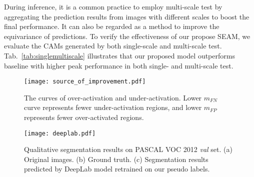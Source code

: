 \documentclass[10pt,twocolumn,letterpaper]{article}
\begin{document}
	During inference, it is a common practice to employ multi-scale test by aggregating the prediction results from images with different scales to boost the final performance. It can also be regarded as a method to improve the equivariance of predictions. To verify the effectiveness of our propose SEAM, we evaluate the CAMs generated by both single-scale and multi-scale test. Tab.~\ref{tab:singlemultiscale} illustrates that our proposed model outperforms baseline with higher peak performance in both single- and multi-scale test.
	\begin{figure}[t]
		\centering
		\texttt{[image: source\_of\_improvement.pdf]}
		\caption{The curves of over-activation and under-activation. Lower $m_{\mathit{FN}}$ curve represents fewer under-activation regions, and lower $m_{\mathit{FP}}$ represents fewer over-activated regions.}
		\label{fig:source}
\end{figure}
	\begin{figure*}[t]
		\centering
		\texttt{[image: deeplab.pdf]}
		\caption{Qualitative segmentation results on PASCAL VOC 2012 \textit{val} set. (a) Original images. (b) Ground truth. (c) Segmentation results predicted by DeepLab model retrained on our pseudo labels.}
		\label{fig:deeplab}
\end{figure*}
\end{document}
